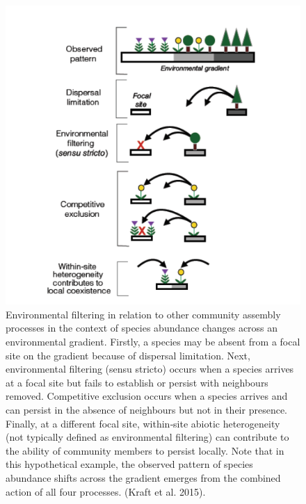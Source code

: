 \documentclass[12pt,oneside]{book}
\begin{document}
\begin{figure}

{\centering \includegraphics[width=0.8\linewidth]{figures/chap7/f78_kraft_filtering} 

}

\caption{Environmental filtering in relation to other community assembly processes in the context of species abundance changes across an environmental gradient. Firstly, a species may be absent from a focal site on the gradient because of dispersal limitation. Next, environmental filtering (sensu stricto) occurs when a species arrives at a focal site but fails to establish or persist with neighbours removed. Competitive exclusion occurs when a species arrives and can persist in the absence of neighbours but not in their presence. Finally, at a different focal site, within‐site abiotic heterogeneity (not typically defined as environmental filtering) can contribute to the ability of community members to persist locally. Note that in this hypothetical example, the observed pattern of species abundance shifts across the gradient emerges from the combined action of all four processes. (Kraft et al. 2015).}\label{fig:f78}
\end{figure}
\end{document}

